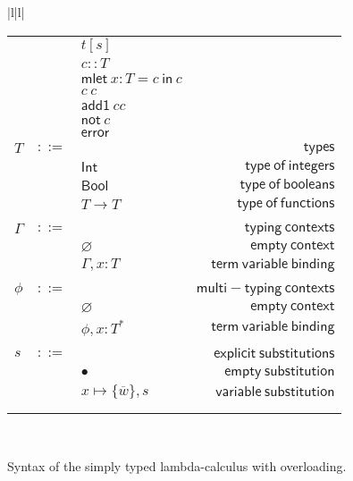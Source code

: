 \documentclass[preprint,authoryear,sort&compress,9pt,nocopyrightspace]{article}
\newcommand{\subx}{x \mapsto \{\overline{w}\},s}
\newcommand{\ascrip}[1]{#1::T}
\newcommand{\oletP}[3]{\mathsf{mlet} \ x : #1 = #2 \ \mathsf{in}  \ #3}
\newcommand{\negacion}[1]{\mathsf{not} \ #1}
\newcommand{\suma}[1]{\mathsf{add1} \ #1}
\newcommand{\boolt}{\mathsf{Bool}}
\newcommand{\intt}{\mathsf{Int}}
\newcommand{\mtP}[1]{#1^{*}}
\newcommand{\emt}{\phi}
\begin{document}
\begin{figure}
\begin{small}
\begin{center}
\begin{tabular}{|l|l|}
\begin{tabular}{l c l r}
&&$t[s]$&\\
&&$\ascrip{c}$&\\
&&$\oletP {T}{c}{c}$&\\
&&$c \ c $&\\
&&$\suma{c}{c}$&\\
&&$\negacion{c}$&\\
&&$\mathsf{error}$&\\
$T$&$::=$&&$\mathsf {types}$\\
&&$\intt$&$\mathsf {type \ of \ integers}$\\
&&$\boolt$&$\mathsf {type \ of \ booleans}$\\
&&$T \to T$&$\mathsf {type \ of \ functions}$\\
&&&\\
$\Gamma$&$::=$&&$\mathsf {typing \ contexts}$\\
&&$\varnothing$&$\mathsf {empty \ context}$\\
&&$\Gamma , x:T$&$\mathsf {term \ variable \ binding}$\\
&&&\\
$\emt$&$::=$&&$\mathsf {multi-typing \ contexts}$\\
&&$\varnothing$&$\mathsf {empty \ context}$\\
&&$\emt,x: \mtP{T}$&$\mathsf {term \ variable \ binding}$\\
&&&\\
$s$&$::=$&&$\mathsf {explicit \ substitutions}$\\
&&$ \bullet$&$\mathsf {empty \ substitution}$\\
&&$\subx$&$\mathsf {variable \ substitution}$\\
&&&\\
&&&\\
\end{tabular}\\
\hline
\end{tabular}
\hspace*{-2cm}
\caption{Syntax of the simply typed lambda-calculus with overloading.}
\label{figure:sencilla}
\end{center}
\end{small}
\end{figure}
\end{document}
